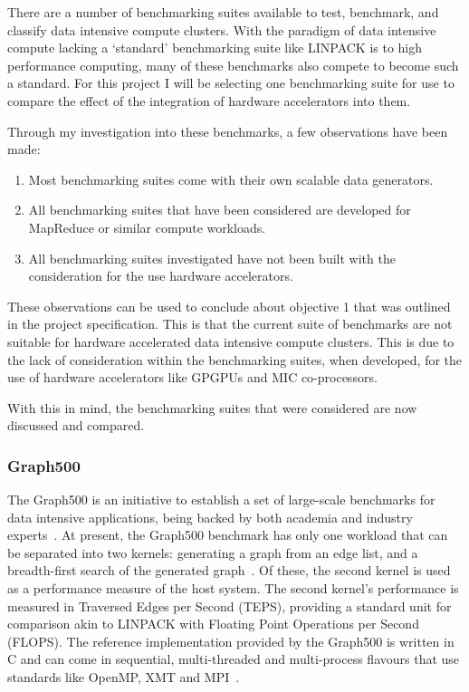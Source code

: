 \documentclass[12pt,a4paper]{article}
\begin{document}
            There are a number of benchmarking suites available to test, benchmark, and classify data intensive compute clusters. With the paradigm of data intensive compute lacking a `standard' benchmarking suite like LINPACK is to high performance computing, many of these benchmarks also compete to become such a standard. For this project I will be selecting one benchmarking suite for use to compare the effect of the integration of hardware accelerators into them.
            
            Through my investigation into these benchmarks, a few observations have been made:
            
            \begin{enumerate}
                \item Most benchmarking suites come with their own scalable data generators.
                \item All benchmarking suites that have been considered are developed for MapReduce or similar compute workloads.
                \item All benchmarking suites investigated have not been built with the consideration for the use hardware accelerators.
            \end{enumerate}
            
            These observations can be used to conclude about objective 1 that was outlined in the project specification. This is that the current suite of benchmarks are not suitable for hardware accelerated data intensive compute clusters. This is due to the lack of consideration within the benchmarking suites, when developed, for the use of hardware accelerators like GPGPUs and MIC co-processors.
            
            With this in mind, the benchmarking suites that were considered are now discussed and compared.
    
            \subsubsection{Graph500}
            \label{ssub:graph500}
            
                The Graph500 is an initiative to establish a set of large-scale benchmarks for data intensive applications, being backed by both academia and industry experts~\cite{graph500-intro}. At present, the Graph500 benchmark has only one workload that can be separated into two kernels: generating a graph from an edge list, and a breadth-first search of the generated graph~\cite{graph500-spec}. Of these, the second kernel is used as a performance measure of the host system. The second kernel's performance is measured in Traversed Edges per Second (TEPS), providing a standard unit for comparison akin to LINPACK with Floating Point Operations per Second (FLOPS). The reference implementation provided by the Graph500 is written in C and can come in sequential, multi-threaded and multi-process flavours that use standards like OpenMP, XMT and MPI~\cite{graph500-reference-impl}.
        
\end{document}
